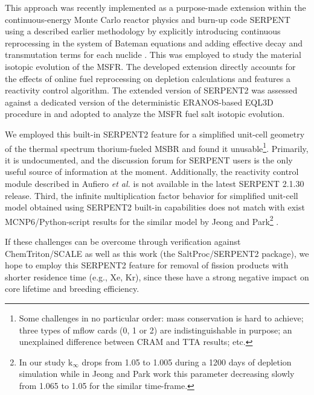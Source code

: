 This approach was recently implemented as a purpose-made extension within the continuous-energy Monte Carlo reactor physics and burn-up code SERPENT \cite{aufiero_extended_2013} 
using a described earlier methodology by explicitly introducing 
continuous reprocessing in the system of Bateman equations and adding effective 
decay and transmutation terms for each nuclide 
\cite{aufiero_extended_2013}. This was employed to study the material isotopic evolution of the 
\gls{MSFR}\cite{aufiero_extended_2013}. The developed extension directly accounts for the effects of online fuel 
reprocessing on depletion calculations and features a reactivity control 
algorithm. The extended version of SERPENT2 was assessed against a dedicated 
version of the deterministic ERANOS-based EQL3D procedure in
\cite{ruggieri_eranos_2006, fiorina_investigation_2013} and adopted to analyze 
the \gls{MSFR} fuel salt isotopic evolution. 

We employed this built-in SERPENT2 feature for a simplified unit-cell geometry of 
the thermal spectrum thorium-fueled \gls{MSBR} and found it unusable\footnote{ 
Some challenges in no particular order: mass conservation is hard to achieve; 
three types of mflow cards (0, 1 or 2) are indistinguishable in purpose; an 
unexplained difference between CRAM and TTA results; etc.}. Primarily,
it is undocumented, and the discussion forum for SERPENT users is the only useful 
source of information at the moment. Additionally, the reactivity control module described in Aufiero \emph{et al.} is 
not available in the latest SERPENT 2.1.30 release. Third, the infinite multiplication 
factor behavior for simplified unit-cell model obtained using SERPENT2 built-in 
capabilities \cite{rykhlevskii_online_2017} does not match with exist MCNP6/Python-script
 results for the similar model by Jeong and Park\footnote{ In our 
study k$_{\infty}$ drops from 1.05 to 1.005 during a 1200 days of depletion simulation 
while in Jeong and Park work this parameter decreasing slowly from 1.065 to 1.05 for the 
similar time-frame.} \cite{jeong_equilibrium_2016}. 

If these challenges can be overcome through verification against
ChemTriton/SCALE as well as this work (the SaltProc/SERPENT2 package), we hope to 
employ this SERPENT2 feature 
for removal of fission products with shorter residence time (e.g., Xe, Kr), 
since these have a strong negative impact on core lifetime and breeding 
efficiency.

